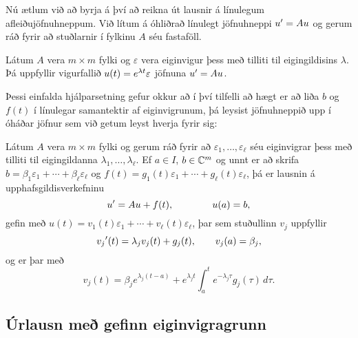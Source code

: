 \noindent
Nú ætlum við að byrja á því að reikna út lausnir á línulegum
afleiðujöfnuhneppum.
Við lítum á óhliðrað
línulegt jöfnuhneppi $u{\sp{\prime}}=Au$ og gerum ráð fyrir að stuðlarnir
í fylkinu $A$  séu fastaföll.

\begin{hs}
Látum $A$ vera $m\times m$ fylki og $\varepsilon$ vera
eiginvigur þess með
tilliti til eigingildisins
$\lambda$. Þá uppfyllir vigurfallið
$u(t)=e\sp{\lambda t}\varepsilon$ jöfnuna $u{\sp{\prime}}=Au$.

{}
\end{hs}

Þessi einfalda hjálparsetning gefur okkur að í því tilfelli að hægt er
að liða $b$ og $f(t)$ í línulegar samantektir af eiginvigrunum, þá
leysist jöfnuhneppið  upp í óháðar jöfnur sem við getum leyst hverja
fyrir sig:

\begin{se}\label{set5.2.2}
Látum $A$ vera $m\times m$ fylki og gerum ráð fyrir að 
$\varepsilon_1,\dots,\varepsilon_\ell$   séu eiginvigrar
þess með tilliti til eigingildanna $\lambda_1,\dots,\lambda_\ell$.  
Ef $a \in I$, $b\in {\mathbb C}^m$ og unnt er að skrifa
$b=\beta_1\varepsilon_1+\cdots+\beta_\ell\varepsilon_\ell$ og 
$f(t)=g_1(t)\varepsilon_1+\cdots+g_\ell(t)\varepsilon_\ell$, þá er
lausnin á upphafsgildisverkefninu 
$$u{\sp{\prime}}=Au+f(t), \qquad \qquad u(a)=b,
$$ 
gefin með  $u(t)=v_1(t)\varepsilon_1+\cdots+v_\ell(t)\varepsilon_\ell$, þar sem
stuðullinn $v_j$  uppfyllir
 \begin{equation*}v_j{\sp{\prime}}(t)=\lambda_jv_j(t)+g_j(t), \qquad v_j(a)=\beta_j,\label{5.2.1}
 \end{equation*}
og er þar með 
 \begin{equation*}v_j(t)=\beta_je^{\lambda_j(t-a)}+e^{\lambda_jt}\int_a^t e^{-\lambda_j
\tau}g_j(\tau) \, d\tau.\label{5.2.2}
 \end{equation*}
\end{se}


\subsection*{Úrlausn með gefinn eiginvigragrunn}

